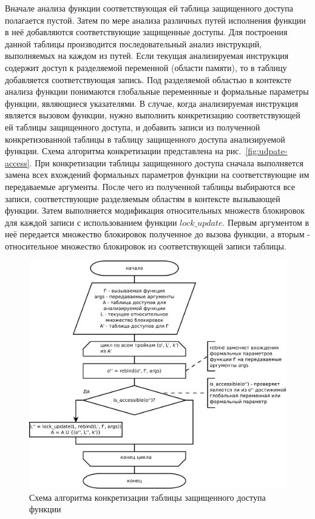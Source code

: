 Вначале анализа функции соответствующая ей таблица защищенного доступа полагается пустой. Затем по мере анализа различных путей исполнения функции в неё добавляются соответствующие защищенные доступы. Для построения данной таблицы производится последовательный анализ инструкций, выполняемых на каждом из путей. Если текущая анализируемая инструкция содержит доступ к разделяемой переменной (области памяти), то в таблицу добавляется соответствующая запись. Под разделяемой областью в контексте анализа функции понимаются глобальные переменнные и формальные параметры функции, являющиеся указателями. В случае, когда анализируемая инструкция является вызовом функции, нужно выполнить конкретизацию соответствующей ей таблицы защищенного доступа, и добавить записи из полученной конкретизованной таблицы в таблицу защищенного доступа анализируемой функции. Схема алгоритма конкретизации представлена на рис.~\ref{fig:udpate-access}. При конкретизации таблицы защищенного доступа сначала выполняется замена всех вхождений формальных параметров функции на соответствующие им передаваемые аргументы. После чего из полученной таблицы выбираются все записи, соответствующие разделяемым областям в контексте вызывающей функции. Затем выполняется модификация относительных множеств блокировок для каждой записи с использованием функции $lock\_update$. Первым аргументом в неё передается множество блокировок полученное до вызова функции, а вторым - относительное множество блокировок из соответствующей записи таблицы.

\begin{figure}
  \centering
  \includegraphics[width=\textwidth]{inc/dia/update-access}
  \caption{Схема алгоритма конкретизации таблицы защищенного доступа функции}
  \label{fig:update-access}
\end{figure}

